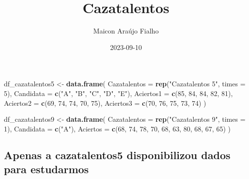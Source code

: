 \documentclass[
]{article}
\title{Cazatalentos}
\author{Maicon Araújo Fialho}
\date{2023-09-10}
\newenvironment{Shaded}{\begin{snugshade}}{\end{snugshade}}
\newcommand{\AttributeTok}[1]{\textcolor[rgb]{0.13,0.29,0.53}{#1}}
\newcommand{\DecValTok}[1]{\textcolor[rgb]{0.00,0.00,0.81}{#1}}
\newcommand{\FunctionTok}[1]{\textcolor[rgb]{0.13,0.29,0.53}{\textbf{#1}}}
\newcommand{\NormalTok}[1]{#1}
\newcommand{\OtherTok}[1]{\textcolor[rgb]{0.56,0.35,0.01}{#1}}
\newcommand{\StringTok}[1]{\textcolor[rgb]{0.31,0.60,0.02}{#1}}
\begin{document}
\maketitle

\begin{Shaded}
\begin{Highlighting}[]
\NormalTok{df\_cazatalentos5 }\OtherTok{\textless{}{-}} \FunctionTok{data.frame}\NormalTok{(}
  \AttributeTok{Cazatalentos =} \FunctionTok{rep}\NormalTok{(}\StringTok{"Cazatalentos 5"}\NormalTok{, }\AttributeTok{times =} \DecValTok{5}\NormalTok{),}
  \AttributeTok{Candidata =} \FunctionTok{c}\NormalTok{(}\StringTok{"A"}\NormalTok{, }\StringTok{"B"}\NormalTok{, }\StringTok{"C"}\NormalTok{, }\StringTok{"D"}\NormalTok{, }\StringTok{"E"}\NormalTok{),}
  \AttributeTok{Aciertos1 =} \FunctionTok{c}\NormalTok{(}\DecValTok{85}\NormalTok{, }\DecValTok{84}\NormalTok{, }\DecValTok{84}\NormalTok{, }\DecValTok{82}\NormalTok{, }\DecValTok{81}\NormalTok{),}
  \AttributeTok{Aciertos2 =} \FunctionTok{c}\NormalTok{(}\DecValTok{69}\NormalTok{, }\DecValTok{74}\NormalTok{, }\DecValTok{74}\NormalTok{, }\DecValTok{70}\NormalTok{, }\DecValTok{75}\NormalTok{),}
  \AttributeTok{Aciertos3 =} \FunctionTok{c}\NormalTok{(}\DecValTok{70}\NormalTok{, }\DecValTok{76}\NormalTok{, }\DecValTok{75}\NormalTok{, }\DecValTok{73}\NormalTok{, }\DecValTok{74}\NormalTok{)}
\NormalTok{)}

\NormalTok{df\_cazatalentos9 }\OtherTok{\textless{}{-}} \FunctionTok{data.frame}\NormalTok{(}
  \AttributeTok{Cazatalentos =} \FunctionTok{rep}\NormalTok{(}\StringTok{"Cazatalentos 9"}\NormalTok{, }\AttributeTok{times =} \DecValTok{1}\NormalTok{),}
  \AttributeTok{Candidata =} \FunctionTok{c}\NormalTok{(}\StringTok{"A"}\NormalTok{),}
  \AttributeTok{Aciertos =} \FunctionTok{c}\NormalTok{(}\DecValTok{68}\NormalTok{, }\DecValTok{74}\NormalTok{, }\DecValTok{78}\NormalTok{, }\DecValTok{70}\NormalTok{, }\DecValTok{68}\NormalTok{, }\DecValTok{63}\NormalTok{, }\DecValTok{80}\NormalTok{, }\DecValTok{68}\NormalTok{, }\DecValTok{67}\NormalTok{, }\DecValTok{65}\NormalTok{)}
\NormalTok{)}
\end{Highlighting}
\end{Shaded}

\hypertarget{apenas-a-cazatalentos5-disponibilizou-dados-para-estudarmos}{%
\subsection{Apenas a cazatalentos5 disponibilizou dados para
estudarmos}\label{apenas-a-cazatalentos5-disponibilizou-dados-para-estudarmos}}
\end{document}
